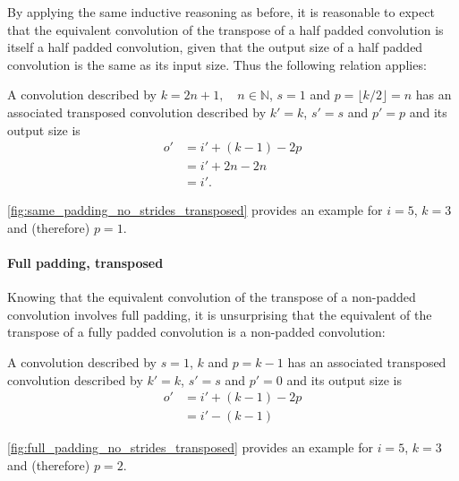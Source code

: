 By applying the same inductive reasoning as before, it is reasonable to expect
that the equivalent convolution of the transpose of a half padded convolution
is itself a half padded convolution, given that the output size of a half
padded convolution is the same as its input size. Thus the following relation
applies:

\begin{relationship}\label{rel:half_padding_no_strides_transposed}
A convolution described by $k = 2n + 1, \quad n \in \mathbb{N}$, $s = 1$ and $p
= \lfloor k / 2 \rfloor = n$ has an associated transposed convolution described
by $k' = k$, $s' = s$ and $p' = p$ and its output size is
\begin{equation*}
\begin{split}
    o' &= i' + (k - 1) - 2p \\
       &= i' + 2n - 2n \\
       &= i'.
\end{split}
\end{equation*}
\end{relationship}

\autoref{fig:same_padding_no_strides_transposed} provides an example for $i =
5$, $k = 3$ and (therefore) $p = 1$.

\paragraph{Full padding, transposed}

Knowing that the equivalent convolution of the transpose of a non-padded
convolution involves full padding, it is unsurprising that the equivalent of
the transpose of a fully padded convolution is a non-padded convolution:

\begin{relationship}\label{rel:full_padding_no_strides_transposed}
A convolution described by $s = 1$, $k$ and $p = k - 1$ has an
associated transposed convolution described by $k' = k$, $s' = s$ and $p' = 0$
and its output size is
\begin{equation*}
\begin{split}
    o' &= i' + (k - 1) - 2p \\
       &= i' - (k - 1)
\end{split}
\end{equation*}
\end{relationship}

\autoref{fig:full_padding_no_strides_transposed} provides an example for $i =
5$, $k = 3$ and (therefore) $p = 2$.

